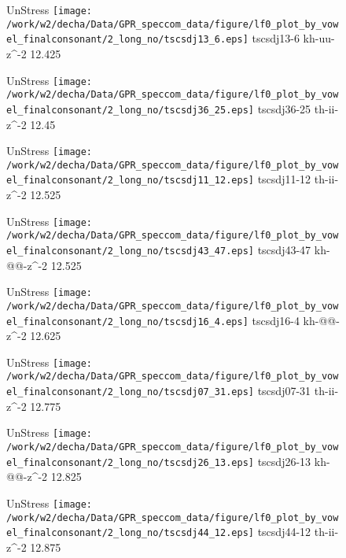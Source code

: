 \documentclass{article}
\begin{document}
\begin{figure}[t]
\begin{minipage}[b]{.24\textwidth}
UnStress
\centering
\texttt{[image: /work/w2/decha/Data/GPR\_speccom\_data/figure/lf0\_plot\_by\_vowel\_finalconsonant/2\_long\_no/tscsdj13\_6.eps]}
tscsdj13-6 kh-uu-z\textasciicircum-2 12.425
\end{minipage}
\begin{minipage}[b]{.24\textwidth}
UnStress
\centering
\texttt{[image: /work/w2/decha/Data/GPR\_speccom\_data/figure/lf0\_plot\_by\_vowel\_finalconsonant/2\_long\_no/tscsdj36\_25.eps]}
tscsdj36-25 th-ii-z\textasciicircum-2 12.45
\end{minipage}
\begin{minipage}[b]{.24\textwidth}
UnStress
\centering
\texttt{[image: /work/w2/decha/Data/GPR\_speccom\_data/figure/lf0\_plot\_by\_vowel\_finalconsonant/2\_long\_no/tscsdj11\_12.eps]}
tscsdj11-12 th-ii-z\textasciicircum-2 12.525
\end{minipage}
\begin{minipage}[b]{.24\textwidth}
UnStress
\centering
\texttt{[image: /work/w2/decha/Data/GPR\_speccom\_data/figure/lf0\_plot\_by\_vowel\_finalconsonant/2\_long\_no/tscsdj43\_47.eps]}
tscsdj43-47 kh-@@-z\textasciicircum-2 12.525
\end{minipage}
\end{figure}

\begin{figure}[t]
\begin{minipage}[b]{.24\textwidth}
UnStress
\centering
\texttt{[image: /work/w2/decha/Data/GPR\_speccom\_data/figure/lf0\_plot\_by\_vowel\_finalconsonant/2\_long\_no/tscsdj16\_4.eps]}
tscsdj16-4 kh-@@-z\textasciicircum-2 12.625
\end{minipage}
\begin{minipage}[b]{.24\textwidth}
UnStress
\centering
\texttt{[image: /work/w2/decha/Data/GPR\_speccom\_data/figure/lf0\_plot\_by\_vowel\_finalconsonant/2\_long\_no/tscsdj07\_31.eps]}
tscsdj07-31 th-ii-z\textasciicircum-2 12.775
\end{minipage}
\begin{minipage}[b]{.24\textwidth}
UnStress
\centering
\texttt{[image: /work/w2/decha/Data/GPR\_speccom\_data/figure/lf0\_plot\_by\_vowel\_finalconsonant/2\_long\_no/tscsdj26\_13.eps]}
tscsdj26-13 kh-@@-z\textasciicircum-2 12.825
\end{minipage}
\begin{minipage}[b]{.24\textwidth}
UnStress
\centering
\texttt{[image: /work/w2/decha/Data/GPR\_speccom\_data/figure/lf0\_plot\_by\_vowel\_finalconsonant/2\_long\_no/tscsdj44\_12.eps]}
tscsdj44-12 th-ii-z\textasciicircum-2 12.875
\end{minipage}
\end{figure}
\end{document}
